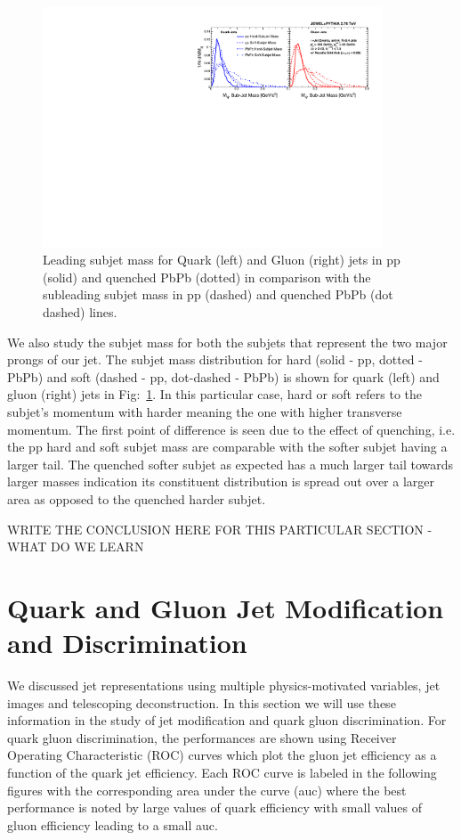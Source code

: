 \documentclass[notoc]{JHEP3}
\begin{document}
\begin{figure}[t]
	   \centering
	   \includegraphics[width=0.9\textwidth]{plots/Comp_subjet_m.pdf}
	   \caption{Leading subjet mass for Quark (left) and Gluon (right) jets in pp (solid) and  quenched PbPb (dotted) in comparison with the subleading subjet mass in pp (dashed) and quenched PbPb (dot dashed) lines. }
\label{fig:comp_subjet_m}
\end{figure}

We also study the subjet mass for both the subjets that represent the two major prongs of our jet. The subjet mass distribution for hard (solid - pp, dotted - PbPb) and soft (dashed - pp, dot-dashed - PbPb) is shown for quark (left) and gluon (right) jets in Fig:~\ref{fig:comp_subjet_m}. In this particular case, hard or soft refers to the subjet's momentum with harder meaning the one with higher transverse momentum. The first point of difference is seen due to the effect of quenching, i.e. the pp hard and soft subjet mass are comparable with the softer subjet having a larger tail. The quenched softer subjet as expected has a much larger tail towards larger masses indication its constituent distribution is spread out over a larger area as opposed to the quenched harder subjet.



WRITE THE CONCLUSION HERE FOR THIS PARTICULAR SECTION - WHAT DO WE LEARN

\section{Quark and Gluon Jet Modification and Discrimination}
\label{sec:results}

We discussed jet representations using multiple physics-motivated variables, jet images and telescoping deconstruction. In this section we will use these information in the study of jet modification and quark gluon discrimination. For quark gluon discrimination, the performances are shown using Receiver Operating Characteristic (ROC) curves which plot the gluon jet efficiency as a function of the quark jet efficiency. Each ROC curve is labeled in the following figures with the corresponding area under the curve (auc) where the best performance is noted by large values of quark efficiency with small values of gluon efficiency leading to a small auc.
\end{document}
